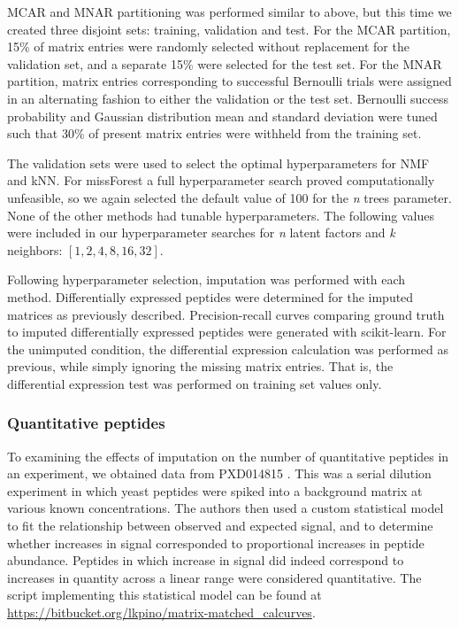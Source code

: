 \documentclass{article}
\begin{document}
MCAR and MNAR partitioning was performed similar to above, but this time we created three disjoint sets: training, validation and test. For the MCAR partition, 15\% of matrix entries were randomly selected without replacement for the validation set, and a separate 15\% were selected for the test set. For the MNAR partition, matrix entries corresponding to successful Bernoulli trials were assigned in an alternating fashion to either the validation or the test set. Bernoulli success probability and Gaussian distribution mean and standard deviation were tuned such that 30\% of present matrix entries were withheld from the training set.  

The validation sets were used to select the optimal hyperparameters for NMF and kNN. For missForest a full hyperparameter search proved computationally unfeasible, so we again selected the default value of 100 for the \textit{n} trees parameter. None of the other methods had tunable hyperparameters. The following values were included in our hyperparameter searches for \textit{n} latent factors and \textit{k} neighbors: $[1,2,4,8,16,32]$.

Following hyperparameter selection, imputation was performed with each method. Differentially expressed peptides were determined for the imputed matrices as previously described. Precision-recall curves comparing ground truth to imputed differentially expressed peptides were generated with scikit-learn. For the unimputed condition, the differential expression calculation was performed as previous, while simply ignoring the missing matrix entries. That is, the differential expression test was performed on training set values only. 

\subsubsection{Quantitative peptides}

To examining the effects of imputation on the number of quantitative peptides in an experiment, we obtained data from PXD014815 \cite{matrix-matched-calib}. 
This was a serial dilution experiment in which yeast peptides were spiked into a background matrix at various known concentrations. The authors then used a custom statistical model to fit the relationship between observed and expected signal, and to determine whether increases in signal corresponded to proportional increases in peptide abundance. Peptides in which increase in signal did indeed correspond to increases in quantity across a linear range were considered quantitative. The script implementing this statistical model can be found at \url{https://bitbucket.org/lkpino/matrix-matched_calcurves}. 
\end{document}
